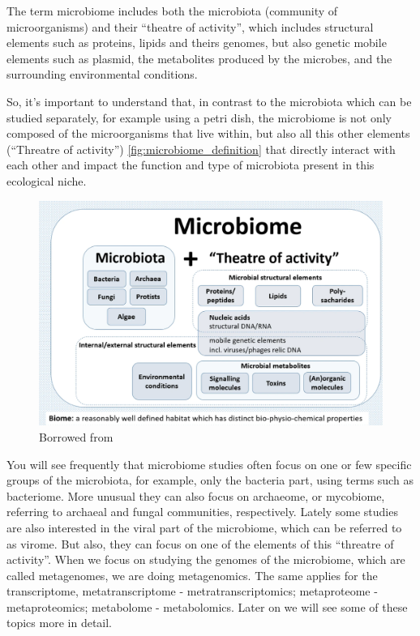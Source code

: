 \begin{definition}[Microbiome]
    The term microbiome includes both the \gls{microbiota} (community of microorganisms) and their “theatre of activity”, 
    which includes structural elements such as proteins, lipids and theirs genomes, but also genetic mobile elements such 
    as plasmid, the metabolites produced by the microbes, and the surrounding environmental conditions.
\end{definition}
So, it's important to understand that, in contrast to the microbiota which can be studied separately, for example using a 
petri dish, the microbiome is not only composed of the microorganisms that live within, but also all this other elements 
(“Threatre of activity”) \autoref{fig:microbiome_definition} that directly interact with each other and impact the function 
and type of microbiota present in this ecological niche.

\begin{figure}[!ht]
    \centering
    \includegraphics[width=1\linewidth]{./figure/microbiome_definition.png}
    \caption{Borrowed from  \cite{Berg2020}}
    \label{fig:microbiome_definition}
\end{figure}

You will see frequently that microbiome studies often focus on one or few specific groups of the microbiota, for example, 
only the bacteria part, using terms such as bacteriome. More unusual they can also focus on archaeome, or mycobiome, 
referring to archaeal and fungal communities, respectively. Lately some studies are also interested in the viral part 
of the microbiome, which can be referred to as virome. But also, they can focus on one of the elements of this 
“threatre of activity”. When we focus on studying the genomes of the microbiome, which are called metagenomes, we are 
doing metagenomics. The same applies for the transcriptome, metatranscriptome - metratranscriptomics; 
metaproteome - metaproteomics; metabolome - metabolomics. Later on we will see some of these topics more in detail.

